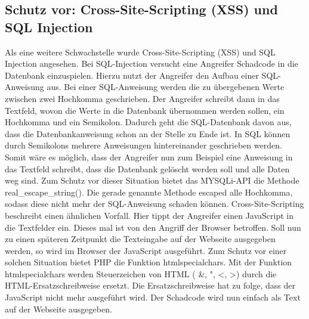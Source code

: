 \subsection{Schutz vor: Cross-Site-Scripting (XSS) und SQL Injection}
Als eine weitere Schwachstelle wurde Cross-Site-Scripting (XSS) und SQL Injection angesehen. Bei SQL-Injection versucht eine Angreifer Schadcode in die Datenbank einzuspielen. Hierzu nutzt der Angreifer den Aufbau einer SQL-Anweisung aus. Bei einer SQL-Anweisung werden die zu übergebenen Werte zwischen zwei Hochkomma geschrieben. Der Angreifer schreibt dann in das Textfeld, wovon die Werte in die Datenbank übernommen werden sollen, ein Hochkomma und ein Semikolon. Dadurch geht die SQL-Datenbank davon aus, dass die Datenbankanweisung schon an der Stelle zu Ende ist. In SQL können durch Semikolons mehrere Anweisungen hintereinander geschrieben werden. Somit wäre es möglich, dass der Angreifer nun zum Beispiel eine Anweisung in das Textfeld schreibt, dass die Datenbank gelöscht werden soll und alle Daten weg sind. Zum Schutz vor dieser Situation bietet das \glqq MYSQLi\grqq{}-API die Methode \glqq real\_escape\_string()\grqq{}. Die gerade genannte Methode \glqq escaped\grqq{} alle Hochkomma, sodass diese nicht mehr der SQL-Anweisung schaden können. Cross-Site-Scripting beschreibt einen ähnlichen Vorfall. Hier tippt der Angreifer einen JavaScript in die Textfelder ein. Dieses mal ist von den Angriff der Browser betroffen. Soll nun zu einen späteren Zeitpunkt die Texteingabe auf der Webseite ausgegeben werden, so wird im Browser der JavaScript ausgeführt. Zum Schutz vor einer solchen Situation bietet PHP die Funktion \glqq htmlspecialchars\grqq{}. Mit der Funktion \glqq htmlspecialchars\grqq{} werden Steuerzeichen von HTML ( \&, ", <, >) durch die HTML-Ersatzschreibweise ersetzt. Die Ersatzschreibweise hat zu folge, dass der JavaScript nicht mehr ausgeführt wird. Der \glqq Schadcode\grqq{} wird nun einfach als Text auf der Webseite ausgegeben.